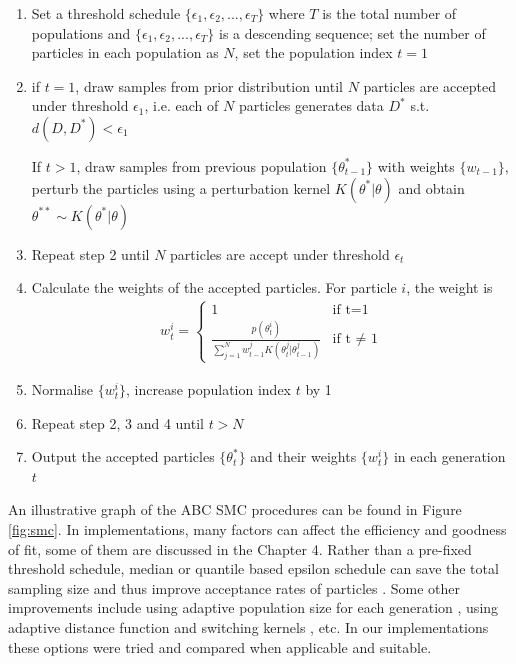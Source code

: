 \begin{enumerate}
    \item Set a threshold schedule $\{\epsilon_1, \epsilon_2, ..., \epsilon_T\}$ where $T$ is the total number of populations and $\{\epsilon_1, \epsilon_2, ..., \epsilon_T\}$ is a descending sequence; set the number of particles in each population as $N$, set the population index $t=1$
    \item if $t=1$, draw samples from prior distribution until $N$ particles are accepted under threshold $\epsilon_1$, i.e. each of $N$ particles generates data $D^*$ s.t. $d(D,D^*)<\epsilon_1$
    
    If $t>1$, draw samples from previous population $\{\theta^*_{t-1}\}$ with weights $\{w_{t-1}\}$, perturb the particles using a perturbation kernel $K(\theta^*|\theta)$ and obtain $\theta^{**}\sim K(\theta^*|\theta)$
    \item Repeat step 2 until $N$ particles are accept under threshold $\epsilon_t$
    \item Calculate the weights of the accepted particles. For particle $i$, the weight is 
    \begin{align}
        \label{eq:weight}
        w^i_t =\begin{cases}
            1 & \text{if t=1} \\
            \frac{p(\theta^i_t)}{\sum_{j=1}^{N} w^j_{t-1}K(\theta^j_t|\theta^j_{t-1})} & \text{if t $\neq$ 1} 
        \end{cases}
    \end{align}
    
    \item Normalise $\{w^i_t\}$, increase population index $t$ by 1
    \item Repeat step 2, 3 and 4 until $t>N$
    \item Output the accepted particles $\{\theta^*_{t}\}$ and their weights $\{w^i_t\}$ in each generation $t$

\end{enumerate}

An illustrative graph of the ABC SMC procedures can be found in Figure \ref{fig:smc}. In implementations, many factors can affect the efficiency and goodness of fit, some of them are discussed in the Chapter 4. Rather than a pre-fixed threshold schedule, median or quantile based epsilon schedule can save the total sampling size and thus improve acceptance rates of particles \cite{threshold}. Some other improvements include using adaptive population size for each generation \cite{population}, using adaptive distance function \cite{ref:adpt_dis} and switching kernels \cite{ref:kernel}, etc. In our implementations these options were tried and compared when applicable and suitable.

